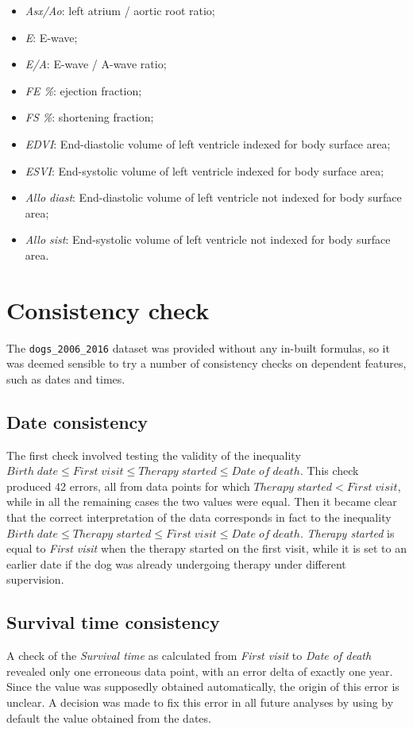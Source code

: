 \documentclass[12pt]{report}
\begin{document}
\begin{itemize}
\item \textit{Asx/Ao}: left atrium / aortic root ratio;
\item \textit{E}: E-wave;
\item \textit{E/A}:	E-wave / A-wave ratio;
\item \textit{FE \%}: ejection fraction;
\item \textit{FS \%}: shortening fraction;
\item \textit{EDVI}: End-diastolic volume of left ventricle indexed for body surface area;
\item \textit{ESVI}: End-systolic volume of left ventricle indexed for body surface area;
\item \textit{Allo diast}: End-diastolic volume of left ventricle not indexed for body surface area;
\item \textit{Allo sist}: End-systolic volume of left ventricle not indexed for body surface area.
\end{itemize}

\section{Consistency check}
The \texttt{dogs\_2006\_2016} dataset was provided without any in-built formulas, so it was deemed sensible to try a number of consistency checks on dependent features, such as dates and times.
\subsection*{Date consistency}
The first check involved testing the validity of the inequality $ Birth\; date \leq First\; visit \leq Therapy\; started \leq Date\; of\; death $. This check produced 42 errors, all from data points for which $ Therapy\; started < First\; visit $, while in all the remaining cases the two values were equal. Then it became clear that the correct interpretation of the data corresponds in fact to the inequality $ Birth\; date \leq Therapy\; started \leq First\; visit \leq Date\; of\; death $. \textit{Therapy started} is equal to \textit{First visit} when the therapy started on the first visit, while it is set to an earlier date if the dog was already undergoing therapy under different supervision.
\subsection*{Survival time consistency}
A check of the \textit{Survival time} as calculated from \textit{First visit} to \textit{Date of death} revealed only one erroneous data point, with an error delta of exactly one year. Since the value was supposedly obtained automatically, the origin of this error is unclear. A decision was made to fix this error in all future analyses by using by default the value obtained from the dates.
\end{document}
